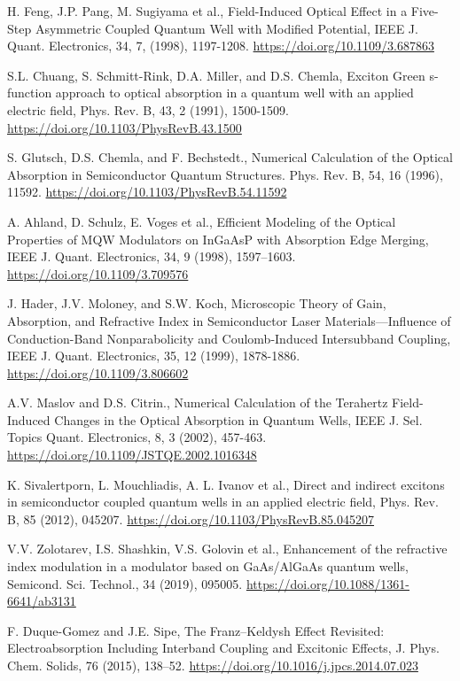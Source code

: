 \documentclass[a4paper,14pt]{extarticle}
\begin{document}
\begin{thebibliography}{99}
     H. Feng, J.P. Pang, M. Sugiyama et al., Field-Induced Optical Effect in a Five-Step Asymmetric Coupled Quantum Well with Modified Potential, IEEE J. Quant. Electronics, 34, 7, (1998), 1197-1208. \url{https://doi.org/10.1109/3.687863}
    
     S.L. Chuang, S. Schmitt-Rink, D.A. Miller, and D.S. Chemla, Exciton Green s-function approach to optical absorption in a quantum well with an applied electric field, Phys. Rev. B, 43, 2 (1991), 1500-1509. \url{https://doi.org/10.1103/PhysRevB.43.1500}
    
     S. Glutsch, D.S. Chemla, and F. Bechstedt., Numerical Calculation of the Optical Absorption in Semiconductor Quantum Structures. Phys. Rev. B, 54, 16 (1996), 11592. \url{https://doi.org/10.1103/PhysRevB.54.11592}
    
     A. Ahland, D. Schulz, E. Voges et al., Efficient Modeling of the Optical Properties of MQW Modulators on InGaAsP with Absorption Edge Merging, IEEE J. Quant. Electronics, 34, 9 (1998), 1597–1603. \url{https://doi.org/10.1109/3.709576}
    
     J. Hader, J.V. Moloney, and S.W. Koch, Microscopic Theory of Gain, Absorption, and Refractive Index in Semiconductor Laser Materials—Influence of Conduction-Band Nonparabolicity and Coulomb-Induced Intersubband Coupling, IEEE J. Quant. Electronics, 35, 12 (1999), 1878-1886. \url{https://doi.org/10.1109/3.806602}
    
     A.V. Maslov and D.S. Citrin., Numerical Calculation of the Terahertz Field-Induced Changes in the Optical Absorption in Quantum Wells, IEEE J. Sel. Topics Quant. Electronics, 8, 3 (2002), 457-463. \url{https://doi.org/10.1109/JSTQE.2002.1016348}
    
     K. Sivalertporn, L. Mouchliadis, A. L. Ivanov et al., Direct and indirect excitons in semiconductor coupled quantum wells in an applied electric field, Phys. Rev. B, 85 (2012), 045207. \url{https://doi.org/10.1103/PhysRevB.85.045207}
    
     V.V. Zolotarev, I.S. Shashkin, V.S. Golovin et al., Enhancement of the refractive index modulation in a modulator based on GaAs/AlGaAs quantum wells, Semicond. Sci. Technol., 34 (2019), 095005. \url{https://doi.org/10.1088/1361-6641/ab3131}
    
     F. Duque-Gomez and J.E. Sipe, The Franz–Keldysh Effect Revisited: Electroabsorption Including Interband Coupling and Excitonic Effects, J. Phys. Chem. Solids, 76 (2015), 138–52. \url{https://doi.org/10.1016/j.jpcs.2014.07.023}
    

\end{thebibliography}
\end{document}
